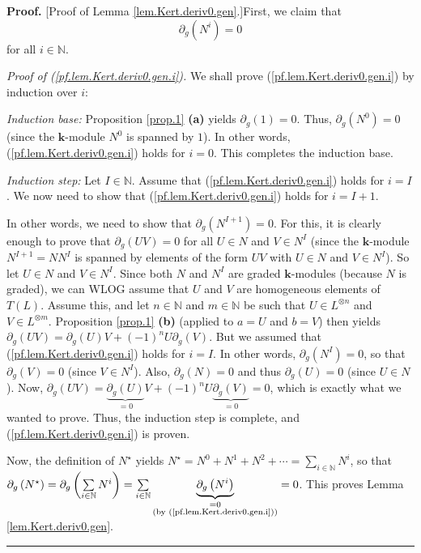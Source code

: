 \documentclass[numbers=enddot,12pt,final,onecolumn,notitlepage]{scrartcl}%
\theoremstyle{definition}
\newenvironment{proof}[1][Proof]{\noindent\textbf{#1.} }{\ \rule{0.5em}{0.5em}}
\let\sumnonlimits\sum
\renewcommand{\sum}{\sumnonlimits\limits}
\begin{document}
\begin{proof}
[Proof of Lemma \ref{lem.Kert.deriv0.gen}.]First, we claim that
\begin{equation}
\partial_{g}\left(  N^{i}\right)  = 0 \label{pf.lem.Kert.deriv0.gen.i}%
\end{equation}
for all $i \in\mathbb{N}$.

\textit{Proof of (\ref{pf.lem.Kert.deriv0.gen.i}).} We shall prove
(\ref{pf.lem.Kert.deriv0.gen.i}) by induction over $i$:

\textit{Induction base:} Proposition \ref{prop.1} \textbf{(a)} yields
$\partial_{g}\left(  1\right)  =0$. Thus, $\partial_{g}\left(  N^{0}\right)  =
0$ (since the $\mathbf{k}$-module $N^{0}$ is spanned by $1$). In other words,
(\ref{pf.lem.Kert.deriv0.gen.i}) holds for $i = 0$. This completes the
induction base.

\textit{Induction step:} Let $I \in\mathbb{N}$. Assume that
(\ref{pf.lem.Kert.deriv0.gen.i}) holds for $i = I$. We now need to show that
(\ref{pf.lem.Kert.deriv0.gen.i}) holds for $i = I+1$.

In other words, we need to show that $\partial_{g}\left(  N^{I+1}\right)  =
0$. For this, it is clearly enough to prove that $\partial_{g}\left(  U
V\right)  = 0$ for all $U \in N$ and $V \in N^{I}$ (since the $\mathbf{k}%
$-module $N^{I+1} = N N^{I}$ is spanned by elements of the form $U V$ with $U
\in N$ and $V \in N^{I}$). So let $U \in N$ and $V \in N^{I}$. Since both $N$
and $N^{I}$ are graded $\mathbf{k}$-modules (because $N$ is graded), we can
WLOG assume that $U$ and $V$ are homogeneous elements of $T\left(  L\right)
$. Assume this, and let $n \in\mathbb{N}$ and $m \in\mathbb{N}$ be such that
$U \in L^{\otimes n}$ and $V \in L^{\otimes m}$. Proposition \ref{prop.1}
\textbf{(b)} (applied to $a=U$ and $b=V$) then yields $\partial_{g}\left(  UV
\right)  =\partial_{g}\left(  U\right)  V+\left(  -1\right)  ^{n}U\partial
_{g}\left(  V\right)  $. But we assumed that (\ref{pf.lem.Kert.deriv0.gen.i})
holds for $i = I$. In other words, $\partial_{g}\left(  N^{I}\right)  = 0$, so
that $\partial_{g}\left(  V\right)  = 0$ (since $V \in N^{I}$). Also,
$\partial_{g}\left(  N\right)  = 0$ and thus $\partial_{g}\left(  U\right)  =
0$ (since $U \in N$). Now, $\partial_{g}\left(  UV \right)
=\underbrace{\partial_{g}\left(  U\right)  }_{=0} V+\left(  -1\right)
^{n}U\underbrace{\partial_{g}\left(  V\right)  }_{=0}=0$, which is exactly
what we wanted to prove. Thus, the induction step is complete, and
(\ref{pf.lem.Kert.deriv0.gen.i}) is proven.

Now, the definition of $N^{\star}$ yields $N^{\star} = N^{0} + N^{1} + N^{2} +
\cdots= \sum_{i\in\mathbb{N}} N^{i}$, so that $\partial_{g}\left(  N^{\star
}\right)  = \partial_{g}\left(  \sum_{i\in\mathbb{N}} N^{i}\right)  =
\sum_{i\in\mathbb{N}} \underbrace{\partial_{g}\left(  N^{i}\right)
}_{\substack{=0 \\\text{(by (\ref{pf.lem.Kert.deriv0.gen.i}))}}} = 0$. This
proves Lemma \ref{lem.Kert.deriv0.gen}.
\end{proof}
\end{document}
